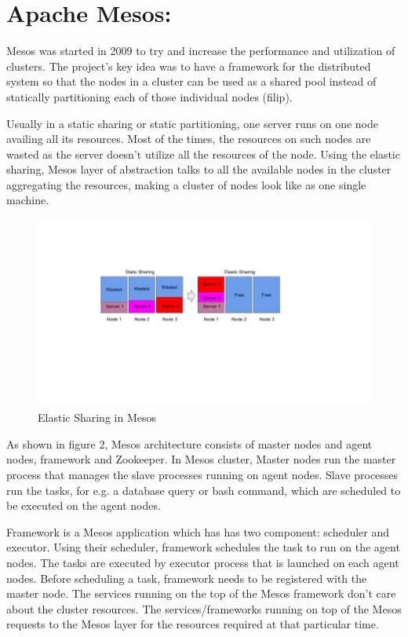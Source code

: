 \section{Apache Mesos:}
\label{sec:mesos}
Mesos was started in 2009 to try and increase the performance and utilization of clusters. The project's key idea was to have a framework for the distributed system so that  the nodes in a cluster can be used as a shared pool instead of statically partitioning each of those individual nodes (filip). 

Usually in a static sharing or static partitioning, one server runs on one node availing all its resources. Most of the times, the resources on such nodes are wasted as the server doesn't utilize all the resources of the node. Using the elastic sharing, Mesos layer of abstraction talks to all the available nodes in the cluster aggregating the resources, making a cluster of nodes look like as one single machine.

\begin{figure}
\centering
\includegraphics[scale=0.5]{./fig/elastic_sharing}
\caption{Elastic Sharing in Mesos}
\label{fig:elastic_sharing}
\end{figure}

As shown in figure 2, Mesos architecture consists of master nodes and agent nodes, framework and Zookeeper. In Mesos cluster, Master nodes run the master process that manages the slave processes running on agent nodes. Slave processes run the tasks, for e.g. a database query or bash command, which are scheduled to be executed on the agent nodes. 

Framework is a Mesos application which has has two component: scheduler and executor. Using their scheduler, framework schedules the task to run on the agent nodes. The tasks are executed by executor process that is launched on each agent nodes. Before scheduling a task, framework needs to be registered with the master node. The services running on the top of the Mesos framework don't care about the cluster resources. The services/frameworks running on top of the Mesos requests to the Mesos layer for the resources required at that particular time.


